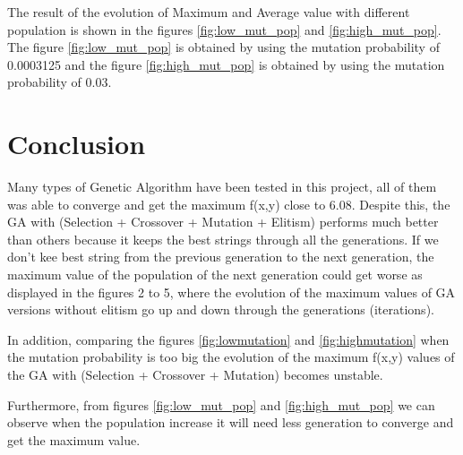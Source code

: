 \documentclass[oneside,onecolumn]{article}
\begin{document}
The result of the evolution of Maximum and Average value with different population is shown in the figures \ref{fig:low_mut_pop} and \ref{fig:high_mut_pop}. The figure \ref{fig:low_mut_pop} is obtained by using the mutation probability of 0.0003125 and the figure \ref{fig:high_mut_pop} is obtained by using the mutation probability of 0.03.



\section{Conclusion}

Many types of Genetic Algorithm have been tested in this project, all of them was able to converge and get the maximum f(x,y) close to 6.08. Despite this, the GA with (Selection + Crossover + Mutation + Elitism) performs much better than others because it keeps the best strings through all the generations. If we don't kee best string from the previous generation to the next generation, the maximum value of the population of the next generation could get worse as displayed in the figures 2 to 5, where the evolution of the maximum values of GA versions without elitism go up and down through the generations (iterations).

In addition, comparing the figures \ref{fig:lowmutation} and \ref{fig:highmutation}  when the mutation probability is too big the evolution of the maximum f(x,y) values of the  GA with (Selection + Crossover + Mutation) becomes unstable. 

Furthermore, from figures \ref{fig:low_mut_pop} and \ref{fig:high_mut_pop} we can observe when the population increase it will need less generation to converge and get the maximum value.







\end{document}
